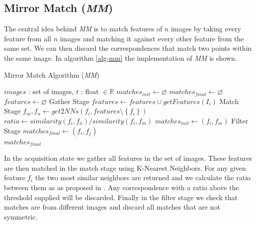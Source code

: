 \documentclass[conference]{IEEEtran}
\begin{document}
\subsection{Mirror Match (\emph{MM})}
%
The central idea behind \emph{MM} is to match features of $n$ images by 
taking every feature from all $n$ images and matching it against every 
other feature from the same set. We can then discard the correspondences 
that match two points within the same image. In algorithm \ref{alg-mm} 
the implementation of \emph{MM} is shown.
%
\begin{algorithm}
\caption{Mirror Match Algorithm (\emph{MM})}
\label{alg-mm}
{\fontsize{10}{10}\selectfont
\begin{algorithmic}
\Require $images$ : set of images, $t$ : float $\in \mathbb{R}$
\State $matches_{init}\gets \varnothing$
\State $matches_{final}\gets \varnothing$
\State $features\gets \varnothing$
 \Comment Gather Stage
	\State $features\gets features \cup getFeatures(I_i)$
\EndFor
{} \Comment Match Stage
	\State $f_m,f_n \gets get2NNs(f_i, features \setminus 
	\left\{f_i\right\})$
	\State $ratio \gets similarity(f_i, f_n) / similarity(f_i, f_m)$
		\State $matches_{init} \gets \left(f_i, f_m\right)$
	\EndIf
\EndFor
{} \Comment Filter 
Stage
		\State $matches_{final} \gets (f_i, f_j)$
	\EndIf
\EndFor \\
\Return $matches_{final}$
\end{algorithmic}
}
\end{algorithm}
%
In the acquisition state we gather all features in the set of images.  
These features are then matched in the match stage using K-Nearest 
Neighbors.  For any given feature $f_i$ the two most similar neighbors 
are returned and we calculate the ratio between them as as proposed in 
\cite{lowe2004sift}.  Any correspondence with a ratio above the 
threshold supplied will be discarded. Finally in the filter stage we 
check that matches are from different images and discard all matches 
that are not symmetric.
%
\end{document}
